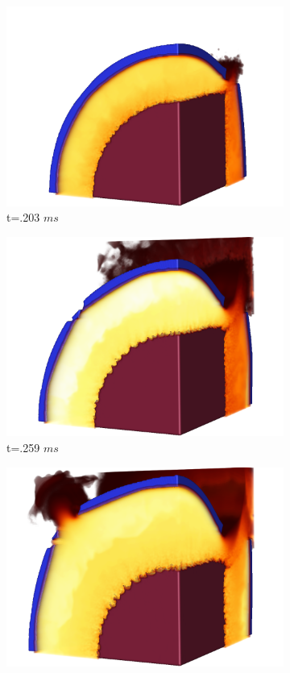 \begin{figure}[t!]
\begin{subfigure}[b]{0.3\textwidth}
   \includegraphics[width=\textwidth]{Figs/mpmice/NE_98_c.png}
   \caption{t=.203 $ms$}
   \label{figCookoff:c}
 \end{subfigure}
 \begin{subfigure}[b]{0.3\textwidth}
   \includegraphics[width=\textwidth]{Figs/mpmice/NE_129_c.png}
   \caption{t=.259 $ms$}
   \label{figCookoff:d}
 \end{subfigure}
 \begin{subfigure}[b]{0.3\textwidth}
   \includegraphics[width=\textwidth]{Figs/mpmice/NE_172_c.png}

\end{subfigure}
\end{figure}
